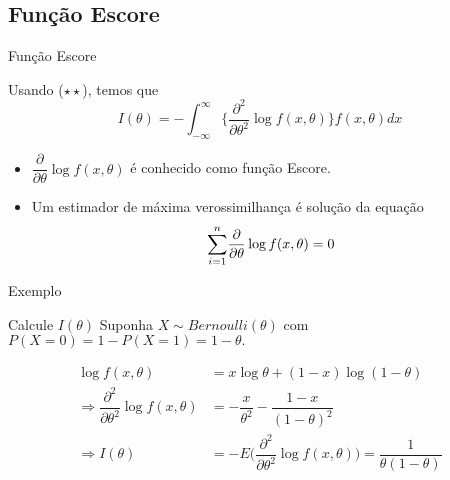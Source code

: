 \documentclass[12pt]{beamer}
\begin{document}
\subsection{Função Escore}
\begin{frame}{Função Escore}
\begin{block}{}
\justifying
Usando ($\star\star$), temos que 
$$I(\theta)=-\int_{-\infty}^{\infty}\Big\{\dfrac{\partial^{2}}{\partial\theta^{2}}\log{f(x,\theta)}\Big\}f(x,\theta)dx$$
\end{block}
\pause
\begin{block}{}
\justifying
\begin{itemize}
    \item $\dfrac{\partial}{\partial\theta}\log{f(x,\theta)}$ é conhecido como função Escore.\pause
    \item Um estimador de máxima verossimilhança é solução da equação 
    \begin{align*}
        {\displaystyle \sum_{i=1}^{n}} \dfrac{\partial}{\partial\theta}\log{f(x,\theta)}=0
    \end{align*}
\end{itemize}
\end{block}
\end{frame}

\begin{frame}{Exemplo}
\begin{block}{Calcule $I(\theta)$}
\justifying
Suponha $X\sim Bernoulli(\theta)$ com $P(X=0)=1-P(X=1)=1-\theta.$
\end{block}
\pause
\begin{block}{}
\justifying
\begin{align*}
\log{f(x,\theta)}&=x\log{\theta}+(1-x)\log{(1-\theta)}\\
\Rightarrow \dfrac{\partial^{2}}{\partial\theta^{2}}\log{f(x,\theta)}&=-\dfrac{x}{\theta^{2}}-\dfrac{1-x}{(1-\theta)^{2}}\\
\Rightarrow I(\theta)&=-E\Big(\dfrac{\partial^{2}}{\partial\theta^{2}}\log{f(x,\theta)}\Big)=\dfrac{1}{\theta(1-\theta)}
\end{align*}
\end{block}
\end{frame}
\end{document}
